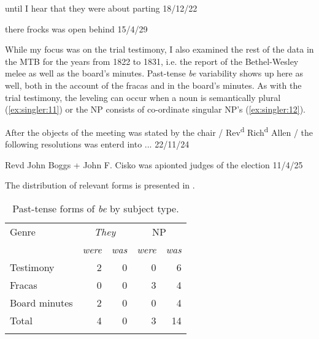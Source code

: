 \documentclass[output=paper,colorlinks,citecolor=brown]{langscibook}
\begin{document}
\ea%
    \label{ex:singler:9}
    until I hear that they were about parting 18/12/22\\
         
\z

\ea%
    \label{ex:singler:10}
    
    there frocks was open behind 15/4/29 \\
 \z          
          
While my focus was on the trial testimony, I also examined the rest of the data in the MTB for the years from 1822 to 1831, i.e. the report of the Bethel-Wesley melee as well as the board’s minutes. Past-tense \textit{be} variability shows up here as well, both in the account of the fracas and in the board’s minutes. As with the trial testimony, the leveling can occur when a noun is semantically plural (\ref{ex:singler:11}) or the NP consists of co-ordinate singular NP’s (\ref{ex:singler:12}). 

\ea%
    \label{ex:singler:11}
     After the objects of the meeting was stated by the chair / Rev\textsuperscript{d}  Rich\textsuperscript{d}  Allen / the following resolutions was enterd into ... 22/11/24\\
        
    \z

      
\ea%
    \label{ex:singler:12}
    Revd John Boggs + John F. Cisko was apionted judges of the election 11/4/25 \\
         
    \z

The distribution of relevant forms is presented in .

\begin {table}
\caption{Past-tense forms of \textit{be} by subject type.}
\begin{tabular}{lrrrr}
\lsptoprule
Genre & \multicolumn{2}{c}{\textit{They}} & \multicolumn{2}{c}{NP}\\\cmidrule(lr){2-3}\cmidrule(lr){4-5}
& \textit{were} & \textit{was} & \textit{were} & \textit{was}\\
\midrule
Testimony & 2 & 0 & 0 & 6\\
Fracas & 0 & 0 & 3 & 4\\
Board minutes & 2 & 0 & 0 & 4\\
  Total & 4 & 0 & 3 & 14\\
\lspbottomrule
\end{tabular}

\label{tab:3 singler:3}
\end{table}
 
\end{document}
